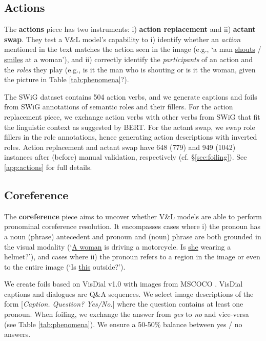 \documentclass[11pt]{article}
\newcommand{\gr}[1]{\textcolor{niceblue}{#1}}
\newcommand\red[1]{\textcolor{niceorange}{#1}}
\begin{document}
\subsection{Actions}\label{subsec:actions}
The \textbf{actions} piece has two instruments: i) \textbf{action replacement} and ii) \textbf{actant swap}.
They 
test a V\&L model's capability to i) identify whether an \textit{action} mentioned in the text matches the action seen in the image (e.g., `a man \underline{\gr{shouts}} / \underline{\red{smiles}} at a woman'), and ii) correctly identify the \textit{participants} of an action and the \textit{roles} they play (e.g., is it the man who is shouting or is it the woman, given the picture in Table \ref{tab:phenomena}?).

The SWiG dataset \cite{DBLP:conf/eccv/PrattYWFK20} contains 504 action verbs, and we
generate captions and foils from SWiG annotations of semantic roles and their fillers. For the action replacement piece, we exchange action verbs with other verbs from SWiG that fit the linguistic context as suggested by BERT. For the actant swap, we swap role fillers in the role annotations, hence generating action descriptions with inverted roles. 
Action replacement and actant swap have 648 (779) and 949 (1042) instances after (before) manual validation, respectively (cf. \S \ref{sec:foiling}).
See \ref{app:actions} for full details.


\subsection{Coreference}\label{subsec:coreference}
The \textbf{coreference} piece aims to uncover whether V\&L models are able to perform pronominal coreference resolution. It encompasses
cases where
i) the pronoun has a noun (phrase) antecedent
and pronoun and (noun) phrase are both grounded in the visual modality (`\underline{A woman} is driving a motorcycle. Is \underline{she} wearing a helmet?'), and cases where
ii) the pronoun refers to a region in the image or even to the  entire image (`Is \underline{this} outside?').

We create foils based on VisDial v1.0 \cite{visdial} with images from MSCOCO \cite{Lin-etal:2014:mscoco}.
VisDial captions and dialogues are
Q\&A sequences. We select image descriptions of the form [\emph{Caption. Question? Yes/No.}] where the question contains at least one pronoun. 
When foiling, we exchange the answer from \emph{yes} to \emph{no} and vice-versa (see Table \ref{tab:phenomena}). We ensure a 50-50\% balance between yes / no answers.
\end{document}
